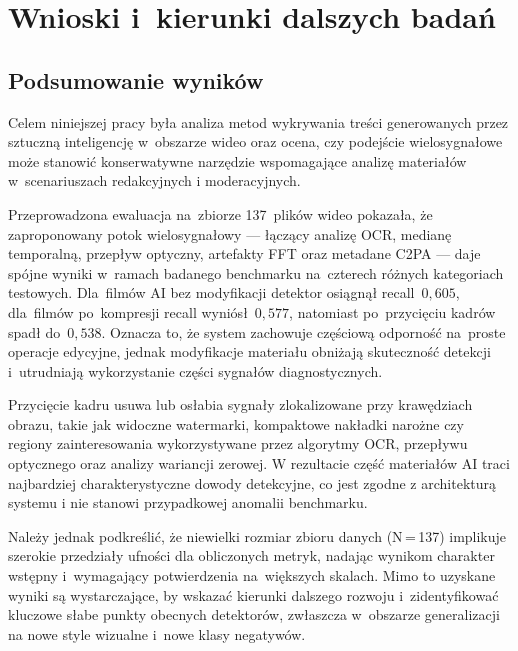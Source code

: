 \chapter{Wnioski i~kierunki dalszych bada\'{n}}
\label{chap:wnioski}

\section{Podsumowanie wynik\'{o}w}

Celem niniejszej pracy by\l{}a analiza metod wykrywania tre\'{s}ci
generowanych przez sztuczn\k{a} inteligencj\k{e} w~obszarze wideo
oraz ocena, czy podej\'{s}cie wielosygna\l{}owe może stanowić
konserwatywne narzędzie wspomagające analizę materiałów w~scenariuszach
redakcyjnych i moderacyjnych.

Przeprowadzona ewaluacja na~zbiorze 137~plik\'{o}w wideo pokaza\l{}a,
\.{z}e zaproponowany potok wielosygna\l{}owy --- \l{}\k{a}cz\k{a}cy analiz\k{e} OCR,
median\k{e} temporaln\k{a}, przep\l{}yw optyczny, artefakty FFT
oraz metadane C2PA --- daje spójne wyniki w~ramach badanego benchmarku
na~czterech r\'{o}\.{z}nych kategoriach testowych. Dla~film\'{o}w AI bez modyfikacji detektor osi\k{a}gn\k{a}\l{}
recall~$0{,}605$, dla~film\'{o}w po~kompresji recall wyniósł~$0{,}577$,
natomiast po~przyci\k{e}ciu kadr\'{o}w spad\l{} do~$0{,}538$. Oznacza to, \.{z}e system
zachowuje cz\k{e}\'{s}ciow\k{a} odporno\'{s}\'{c} na~proste operacje edycyjne, jednak
modyfikacje materia\l{}u obni\.{z}aj\k{a} skuteczno\'{s}\'{c} detekcji i~utrudniaj\k{a}
wykorzystanie cz\k{e}\'{s}ci sygna\l{}\'{o}w diagnostycznych.

Przycięcie kadru usuwa lub osłabia sygnały zlokalizowane przy krawędziach obrazu,
takie jak widoczne watermarki, kompaktowe nakładki narożne czy regiony zainteresowania
wykorzystywane przez algorytmy OCR, przepływu optycznego oraz analizy wariancji zerowej.
W rezultacie część materiałów AI traci najbardziej charakterystyczne dowody detekcyjne,
co jest zgodne z architekturą systemu i nie stanowi przypadkowej anomalii benchmarku.

Należy jednak podkreślić, że niewielki rozmiar zbioru danych (N\,=\,137)
implikuje szerokie przedziały ufności dla obliczonych metryk, nadając wynikom
charakter wstępny i~wymagający potwierdzenia na~większych skalach.
Mimo to uzyskane wyniki są wystarczające, by wskazać kierunki dalszego rozwoju
i~zidentyfikować kluczowe słabe punkty obecnych detektorów, zwłaszcza w~obszarze
generalizacji na nowe style wizualne i~nowe klasy negatywów.

